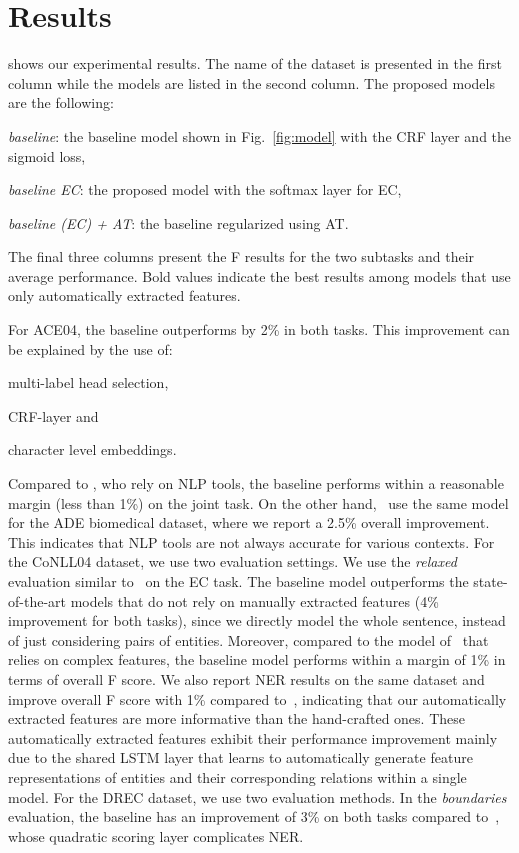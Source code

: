 \documentclass[11pt,a4paper]{article}
\begin{document}
\section{Results}
\label{sec:results}
\noindent {} shows our experimental results. The name of the dataset is presented in the first column while the models are listed in the second column. The proposed models are the following:
\begin{enumerate*}[label=(\roman*)]
\item \emph{baseline}: the baseline model shown in Fig.~\ref{fig:model} with the CRF layer and the sigmoid loss,
\item \emph{baseline EC}: the proposed model with the softmax layer for EC,
\item \emph{baseline (EC) + AT}: the baseline regularized using AT.
\end{enumerate*}
The final three columns present the F results for the two subtasks and their average performance. 
Bold values indicate the best results among models that use only automatically extracted features. 

For ACE04, the baseline outperforms  by 2\% in both tasks. This improvement can be explained by the use of:
\begin{enumerate*}[label=(\roman*)]
\item multi-label head selection,
\item CRF-layer and
\item character level embeddings.
\end{enumerate*} 
Compared to , who rely on NLP tools, the baseline performs within a reasonable margin (less than 1\%) on the joint task. On the other hand,~ use the same model for the ADE biomedical dataset, where we report a 2.5\% overall improvement. This indicates that NLP tools are not always accurate for various contexts.
For the CoNLL04 dataset, we use two evaluation settings. We use the \emph{relaxed} evaluation similar to~ on the EC task. The baseline model outperforms the state-of-the-art models that do not rely on manually extracted features (4\% improvement for both tasks), since we directly model the whole sentence, instead of just considering pairs of entities. Moreover, compared to the model of~ that relies on complex features, the baseline model performs within a margin of 1\% in terms of overall F score.
We also report NER results on the same dataset and improve overall F score with 1\% compared to~, 
indicating that our automatically extracted features are more informative than the hand-crafted ones. 
These automatically extracted features exhibit their performance improvement mainly due to the shared LSTM layer that learns to automatically generate
feature representations of entities and their corresponding relations within a single model.
For the DREC dataset, we use two evaluation methods. In the \emph{boundaries} evaluation, the baseline has an improvement of 3\% on both tasks compared to~, whose quadratic scoring layer complicates NER. 
\end{document}
